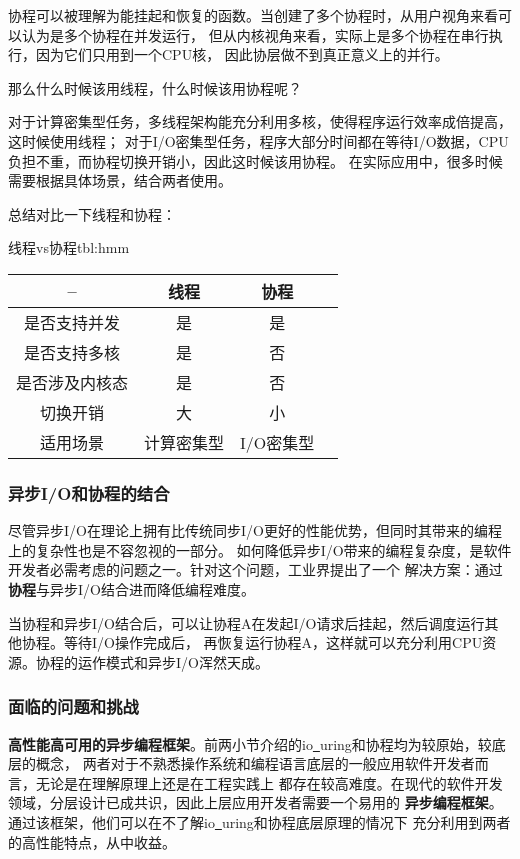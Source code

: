 \documentclass[supercite]{HustGraduPaper}
\theoremstyle{definition}
\begin{document}
协程可以被理解为能挂起和恢复的函数。当创建了多个协程时，从用户视角来看可以认为是多个协程在并发运行，
但从内核视角来看，实际上是多个协程在串行执行，因为它们只用到一个CPU核，
因此协层做不到真正意义上的并行\cite{bogaerts2010concurrency}。\par

那么什么时候该用线程，什么时候该用协程呢？\par

对于计算密集型任务，多线程架构能充分利用多核，使得程序运行效率成倍提高，这时候使用线程；
对于I/O密集型任务，程序大部分时间都在等待I/O数据，CPU负担不重，而协程切换开销小，因此这时候该用协程。
在实际应用中，很多时候需要根据具体场景，结合两者使用。\par

总结对比一下线程和协程：

\begin{generaltab}{线程vs协程}{tbl:hmm}
  \begin{tabular}{c|ccc}
    \toprule
    -- & 线程 & 协程 \\
    \midrule
    是否支持并发 & 是 & 是 \\
    是否支持多核 & 是 & 否 \\
    是否涉及内核态 & 是 & 否 \\
    切换开销 & 大 & 小 \\
    适用场景 & 计算密集型 & I/O密集型 \\
    \bottomrule
  \end{tabular}
\end{generaltab}

\subsubsection{异步I/O和协程的结合}
尽管异步I/O在理论上拥有比传统同步I/O更好的性能优势，但同时其带来的编程上的复杂性也是不容忽视的一部分。
如何降低异步I/O带来的编程复杂度，是软件开发者必需考虑的问题之一。针对这个问题，工业界提出了一个
解决方案：通过\textbf{协程}与异步I/O结合进而降低编程难度。\par

当协程和异步I/O结合后，可以让协程A在发起I/O请求后挂起，然后调度运行其他协程。等待I/O操作完成后，
再恢复运行协程A，这样就可以充分利用CPU资源。协程的运作模式和异步I/O浑然天成。\par

\subsubsection{面临的问题和挑战}
\textbf{高性能高可用的异步编程框架}。前两小节介绍的io\underline{~}uring和协程均为较原始，较底层的概念，
两者对于不熟悉操作系统和编程语言底层的一般应用软件开发者而言，无论是在理解原理上还是在工程实践上
都存在较高难度。在现代的软件开发领域，分层设计已成共识，因此上层应用开发者需要一个易用的
\textbf{异步编程框架}。通过该框架，他们可以在不了解io\underline{~}uring和协程底层原理的情况下
充分利用到两者的高性能特点，从中收益。\par
\end{document}
